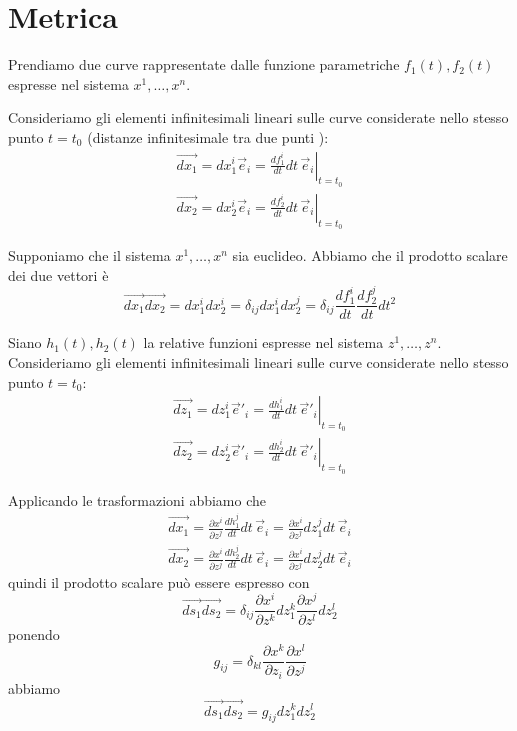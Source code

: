 \documentclass[a4paper,11pt]{article}
\begin{document}
\section{Metrica}

Prendiamo due curve rappresentate dalle funzione parametriche $ f_1(t), f_2(t) $ espresse nel
sistema $ x^1, \dots, x^n $.

Consideriamo gli elementi infinitesimali lineari sulle curve considerate nello stesso punto $ t = t_0 $
(distanze infinitesimale tra due punti ):
\begin{eqnarray*}
	\vec {dx_1} = dx_1^i \vec e_i = \left. \frac{d f^i_1}{dt} dt \, \vec e_i \right|_{t=t_0}
\\
	\vec {dx_2} = dx_2^i \vec e_i = \left. \frac{d f^i_2}{dt} dt \, \vec e_i \right|_{t=t_0}
\end{eqnarray*}

Supponiamo che il sistema $ x^1, \dots, x^n $ sia euclideo.
Abbiamo che il prodotto scalare dei due vettori è
\begin{equation}
	\vec{dx_1} \vec{dx_2} = dx_1^i dx_2^i = \delta_{ij} dx_1^i dx_2^j = \delta_{ij} \frac{d f^i_1}{dt} \frac{d f^j_2}{dt} dt^2
\end{equation}

Siano $ h_1(t), h_2(t) $ la relative funzioni espresse nel sistema $ z^1, \dots, z^n $.
Consideriamo gli elementi infinitesimali lineari sulle curve considerate nello stesso punto $ t = t_0 $:
\begin{eqnarray*}
	\vec {dz_1} = dz_1^i \vec e'_i = \left. \frac{d h^i_1}{dt} dt \, \vec e'_i \right|_{t=t_0}
\\
	\vec {dz_2} = dz_2^i \vec e'_i = \left. \frac{d h^i_2}{dt} dt \, \vec e'_i \right|_{t=t_0}
\end{eqnarray*}

Applicando le trasformazioni abbiamo che
\begin{eqnarray*}
	\vec {dx_1} = \frac{\partial x^i}{\partial z^j}  \frac{d h^j_1}{dt} dt \, \vec e_i =  \frac{\partial x^i}{\partial z^j}  dz_1^j dt \, \vec e_i 
\\
	\vec {dx_2} = \frac{\partial x^i}{\partial z^j}  \frac{d h^j_2}{dt} dt \, \vec e_i = \frac{\partial x^i}{\partial z^j} dz^j_2 dt \, \vec e_i 
\end{eqnarray*}
quindi il prodotto scalare può essere espresso con
\[
	\vec {ds_1} \vec {ds_2} = \delta_{ij} \frac{\partial x^i}{\partial z^k} dz^k_1 \frac{\partial x^j}{\partial z^l} dz^l_2
\]
ponendo
\[
	g_{ij} = \delta_{kl} \frac{\partial x^k}{\partial z_i} \frac{\partial x^l}{\partial z^j}
\]
abbiamo
\[
	\vec {ds_1} \vec {ds_2} = g_{ij} dz^k_1 dz^l_2
\]
\end{document}
